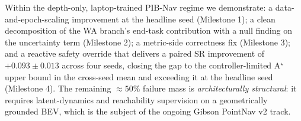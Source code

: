 \documentclass[11pt,a4paper]{article}
\begin{document}
Within the depth-only, laptop-trained PIB-Nav regime we demonstrate:
a data-and-epoch-scaling improvement at the headline seed (Milestone
1); a clean decomposition of the WA branch's end-task contribution
with a null finding on the uncertainty term (Milestone 2); a
metric-side correctness fix (Milestone 3); and a reactive safety
override that delivers a paired SR improvement of
$\mathbf{+0.093 \pm 0.013}$ across four seeds, closing the gap to
the controller-limited A$^\star$ upper bound in the cross-seed mean
and exceeding it at the headline seed (Milestone 4). The remaining
$\approx 50\%$ failure mass is \emph{architecturally structural}: it
requires latent-dynamics and reachability supervision on a
geometrically grounded BEV, which is the subject of the ongoing
Gibson PointNav v2 track.

\end{document}
